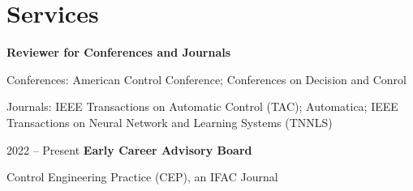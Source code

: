     \section{Services}
        \begin{twocolentry}{}
             \textbf{Reviewer for Conferences and Journals}\end{twocolentry}
        \vspace{0.10 cm}
        \begin{onecolentry}
            \begin{highlights}
                \item Conferences: American Control Conference; Conferences on Decision and Conrol
                \item Journals: IEEE Transactions on Automatic Control (TAC); Automatica; IEEE Transactions on Neural Network and Learning Systems (TNNLS)
            \end{highlights}
        \end{onecolentry}
        \vspace{0.20 cm}

    
        \begin{twocolentry}{2022 -- Present}
            \textbf{Early Career Advisory Board}\end{twocolentry}
        \vspace{0.10 cm}
                \begin{onecolentry}
            \begin{highlights}
                \item Control Engineering Practice (CEP), an IFAC Journal
            \end{highlights}
        \end{onecolentry}
        \vspace{0.20 cm}

